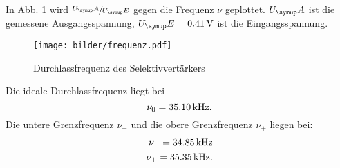 In Abb. \ref{fig:Durchlass} wird $\sfrac{U_\su{A}}{U_\su{E}}$ gegen die Frequenz
$\nu$ geplottet. $U_\su{A}$ ist die gemessene Ausgangsspannung, $U_\su{E} = 0.41\,\si{\volt}$
ist die Eingangsspannung.
\begin{figure}
  \centering
  \texttt{[image: bilder/frequenz.pdf]}
  \caption{Durchlassfrequenz des Selektivvertärkers}
  \label{fig:Durchlass}
\end{figure}
Die ideale Durchlassfrequenz liegt bei
\begin{equation}
  \nu_0 = 35.10 \,\si{\kilo\hertz}.
\end{equation}
Die untere Grenzfrequenz $\nu_-$ und die obere Grenzfrequenz $\nu_+$ liegen bei:
\begin{align}
  \nu_- = 34.85 \,\si{\kilo\hertz} \\
  \nu_+ = 35.35 \,\si{\kilo\hertz}.
\end{align}









